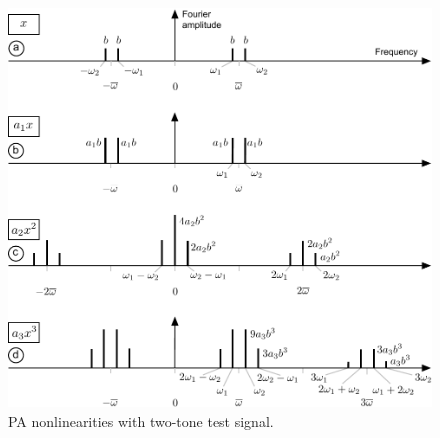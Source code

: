 \documentclass[11pt,oneside,a4paper]{scrartcl}
\newcommand{\BL}[1]{\color{blue}#1 \color{black}}
\begin{document}
\begin{figure}
\centering
\includegraphics[width=0.9\linewidth]{fig/pa_3ic}
\caption [CAPTION TO LISTING] 
{
\BL{PA nonlinearities with two-tone test signal.}
}
\label{Fig:pa_3ic}
\end{figure}


\end{document}
